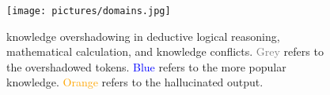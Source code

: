 \begin{figure}[t]
    \centering
    \texttt{[image: pictures/domains.jpg]}
    \caption{knowledge overshadowing in deductive logical reasoning, mathematical calculation, and knowledge conflicts. \textcolor{gray}{Grey} refers to the overshadowed tokens. \textcolor{blue}{Blue} refers to the more popular knowledge. \textcolor{orange}{Orange} refers to the hallucinated output.}\label{fig:domains}
\end{figure}